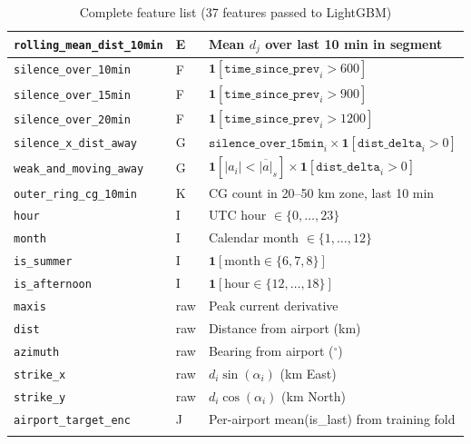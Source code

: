 \documentclass[12pt,a4paper]{article}
\begin{document}
\begin{longtable}{L{3.8cm} C{1.4cm} L{8.5cm}}
\texttt{rolling\_mean\_dist\_10min}& E & Mean $d_j$ over last 10 min in segment \\
\midrule
\texttt{silence\_over\_10min}    & F & $\mathbf{1}[\texttt{time\_since\_prev}_i > 600]$ \\
\texttt{silence\_over\_15min}    & F & $\mathbf{1}[\texttt{time\_since\_prev}_i > 900]$ \\
\texttt{silence\_over\_20min}    & F & $\mathbf{1}[\texttt{time\_since\_prev}_i > 1200]$ \\
\midrule
\texttt{silence\_x\_dist\_away}  & G & $\texttt{silence\_over\_15min}_i \times \mathbf{1}[\texttt{dist\_delta}_i>0]$ \\
\texttt{weak\_and\_moving\_away} & G & $\mathbf{1}[|a_i| < \overline{|a|}_s] \times \mathbf{1}[\texttt{dist\_delta}_i>0]$ \\
\midrule
\texttt{outer\_ring\_cg\_10min}  & K & CG count in 20--50 km zone, last 10 min \\
\midrule
\texttt{hour}                    & I & UTC hour $\in \{0,\ldots,23\}$ \\
\texttt{month}                   & I & Calendar month $\in \{1,\ldots,12\}$ \\
\texttt{is\_summer}              & I & $\mathbf{1}[\text{month} \in \{6,7,8\}]$ \\
\texttt{is\_afternoon}           & I & $\mathbf{1}[\text{hour} \in \{12,\ldots,18\}]$ \\
\midrule
\texttt{maxis}                   & raw & Peak current derivative \\
\texttt{dist}                    & raw & Distance from airport (km) \\
\texttt{azimuth}                 & raw & Bearing from airport ($^\circ$) \\
\texttt{strike\_x}               & raw & $d_i \sin(\alpha_i)$ (km East) \\
\texttt{strike\_y}               & raw & $d_i \cos(\alpha_i)$ (km North) \\
\midrule
\texttt{airport\_target\_enc}    & J  & Per-airport mean(is\_last) from training fold \\
\bottomrule
\caption{Complete feature list (37 features passed to LightGBM)}
\end{longtable}
\end{document}
